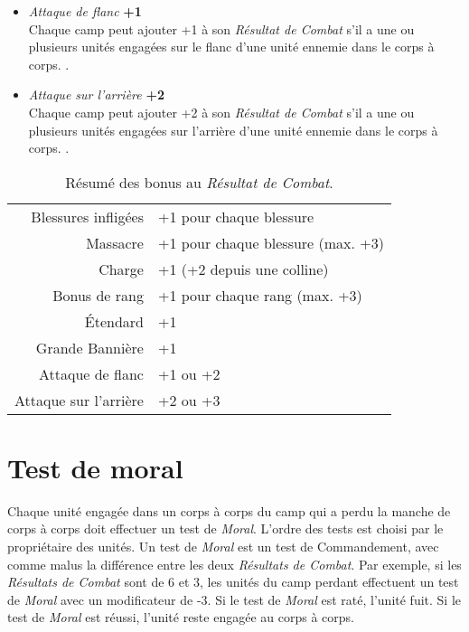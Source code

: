 \begin{multicols}{2}
\begin{itemize}[label={-}]
\item \emph{Attaque de flanc} \dotfill \textbf{+1 } \\
Chaque camp peut ajouter +1 à son \emph{Résultat de Combat} s'il a une ou plusieurs unités engagées sur le flanc d'une unité ennemie dans le corps à corps. .
\item \emph{Attaque sur l'arrière} \dotfill \textbf{+2 } \\
Chaque camp peut ajouter +2 à son \emph{Résultat de Combat} s'il a une ou plusieurs unités engagées sur l'arrière d'une unité ennemie dans le corps à corps. .
\end{itemize}
\end{multicols}

\begin{table}[!htbp]
\centering
\begin{tabular}{r|l}
Blessures infligées & +1 pour chaque blessure \tabularnewline
Massacre & +1 pour chaque blessure (max. +3) \tabularnewline
Charge & +1 (+2 depuis une colline) \tabularnewline
Bonus de rang & +1 pour chaque rang (max. +3) \tabularnewline
Étendard & +1 \tabularnewline
Grande Bannière & +1 \tabularnewline
Attaque de flanc & +1 ou +2 \tabularnewline
Attaque sur l'arrière & +2 ou +3 \tabularnewline
\end{tabular}
\caption{\label{table/resultat_combat}Résumé des bonus au \emph{Résultat de Combat}.}
\end{table}

\section{Test de moral}
\label{cac/moral}

Chaque unité engagée dans un corps à corps du camp qui a perdu la manche de corps à corps doit effectuer un test de \emph{Moral}. L'ordre des tests est choisi par le propriétaire des unités. Un test de \emph{Moral} est un test de Commandement, avec comme malus la différence entre les deux \emph{Résultats de Combat}. Par exemple, si les \emph{Résultats de Combat} sont de 6 et 3, les unités du camp perdant effectuent un test de \emph{Moral} avec un modificateur de -3. Si le test de \emph{Moral} est raté, l'unité fuit. Si le test de \emph{Moral} est réussi, l'unité reste engagée au corps à corps.

